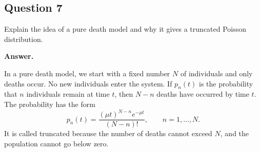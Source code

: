 \documentclass[12pt]{article}
\begin{document}
\subsection*{Question 7}

Explain the idea of a pure death model and why it gives a truncated Poisson distribution.

\textbf{Answer.}

In a pure death model, we start with a fixed number \(N\) of individuals and only deaths occur. No new individuals enter the system. If \(p_n(t)\) is the probability that \(n\) individuals remain at time \(t\), then \(N-n\) deaths have occurred by time \(t\). The probability has the form
\[
p_n(t)=\frac{(\mu t)^{N-n}e^{-\mu t}}{(N-n)!},
\qquad n=1,\ldots,N.
\]
It is called truncated because the number of deaths cannot exceed \(N\), and the population cannot go below zero.
\end{document}
